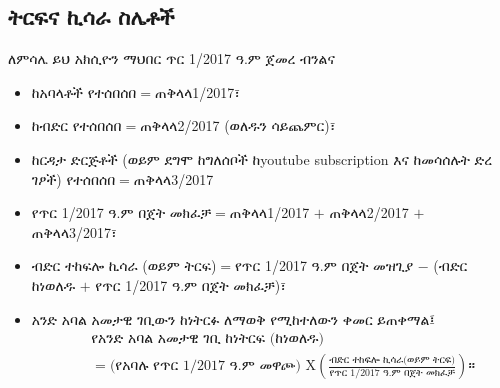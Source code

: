 \documentclass[a4paper,12pt]{article}
\newenvironment{geez}{\geezfont}{}
\begin{document}
\subsection{\begin{geez}ትርፍና ኪሳራ ስሌቶች\end{geez}}  
ለምሳሌ ይህ አክሲዮን ማህበር ጥር 1/2017 ዓ.ም ጀመረ ብንልና     
\begin{itemize}
\item ከአባላቶች የተሰበሰበ$=$ጠቅላላ1/2017፣
\item ከብድር የተሰበሰበ$=$ጠቅላላ2/2017 (ወለዱን ሳይጨምር)፣
\item ከርዳታ ድርጅቶች (ወይም ደግሞ ከግለሰቦች ከyoutube subscription እና ከመሳሰሉት ድረ ገፆች) የተሰበሰበ$=$ጠቅላላ3/2017
\item የጥር 1/2017 ዓ.ም በጀት መክፈቻ$=$ጠቅላላ1/2017 $+$ ጠቅላላ2/2017 $+$ ጠቅላላ3/2017፣
\item ብድር ተከፍሎ ኪሳራ (ወይም ትርፍ)$=$የጥር 1/2017 ዓ.ም በጀት መዝጊያ $-$ (ብድር ከነወለዱ $+$ የጥር 1/2017 ዓ.ም በጀት መክፈቻ)፣
\item አንድ አባል አመታዊ ገቢውን ከነትርፉ ለማወቅ የሚከተለውን ቀመር ይጠቀማል፤
 \begin{eqnarray*}
&& \text{የአንድ አባል አመታዊ ገቢ ከነትርፍ (ከነወለዱ)}\\
&& = \text{(የአባሉ የጥር 1/2017 ዓ.ም መዋጮ) X} \left(\frac{\text{ብድር ተከፍሎ ኪሳራ(ወይም ትርፍ)}}{\text{የጥር 1/2017 ዓ.ም በጀት መክፈቻ}}\right)።
 \end{eqnarray*}
\end{itemize}
\end{document}
